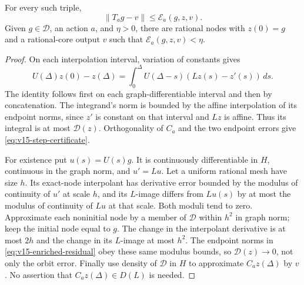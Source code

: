 \begin{lemma}\label{lem:v15-path}
For every such triple,
\[
 \|T_ag-v\|\le\mathcal E_a(g,z,v).
\]
Given $g\in\mathscr D$, an action $a$, and $\eta>0$, there are rational
nodes with $z(0)=g$ and a rational-core output $v$ such that
$\mathcal E_a(g,z,v)<\eta$.
\end{lemma}
\begin{proof}
On each interpolation interval, variation of constants gives
\[
 U(\Delta)z(0)-z(\Delta)
       =\int_0^\Delta U(\Delta-s)(Lz(s)-z'(s))\,ds.
\]
The identity follows first on each graph-differentiable interval and
then by concatenation. The integrand's norm is bounded by the affine
interpolation of its endpoint norms, since $z'$ is constant on that
interval and $Lz$ is affine. Thus its integral is at most
$\mathcal D(z)$. Orthogonality of $C_a$ and the two endpoint errors
give \eqref{eq:v15-step-certificate}.

For existence put $u(s)=U(s)g$. It is continuously differentiable in
$H$, continuous in the graph norm, and $u'=Lu$. Let a uniform rational
mesh have size $h$. Its exact-node interpolant has derivative error
bounded by the modulus of continuity of $u'$ at scale $h$, and its
$L$-image differs from $Lu(s)$ by at most the modulus of continuity of
$Lu$ at that scale. Both moduli tend to zero. Approximate each noninitial
node by a member of $\mathscr D$ within $h^2$ in graph norm; keep the
initial node equal to $g$. The change in the interpolant derivative is
at most $2h$ and the change in its $L$-image at most $h^2$.
The endpoint norms in \eqref{eq:v15-enriched-residual} obey these same
modulus bounds, so $\mathcal D(z)\to0$, not only the orbit error.
Finally use density of $\mathscr D$ in $H$ to approximate
$C_az(\Delta)$ by $v$. No assertion that $C_az(\Delta)\in D(L)$ is
needed.
\end{proof}

